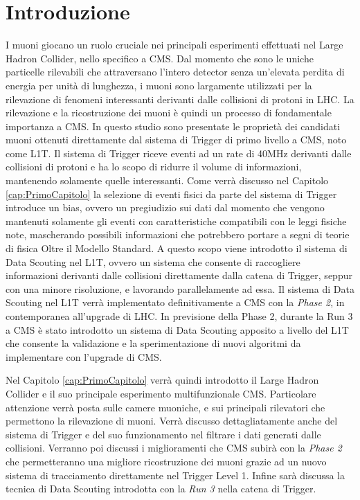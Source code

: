 \chapter{Introduzione}
\label{cap:Introduzione}

I muoni giocano un ruolo cruciale nei principali esperimenti effettuati nel Large Hadron Collider, nello specifico a CMS. Dal momento che sono le uniche particelle rilevabili che attraversano l'intero detector senza un'elevata perdita di energia per unità di lunghezza, i muoni sono largamente utilizzati per la rilevazione di fenomeni interessanti derivanti dalle collisioni di protoni in LHC. La rilevazione e la ricostruzione dei muoni è quindi un processo di fondamentale importanza a CMS.\newline
In questo studio sono presentate le proprietà dei candidati muoni ottenuti direttamente dal sistema di Trigger di primo livello a CMS, noto come L1T. Il sistema di Trigger riceve eventi ad un rate di 40MHz derivanti dalle collisioni di protoni e ha lo scopo di ridurre il volume di informazioni, mantenendo solamente quelle interessanti.
Come verrà discusso nel Capitolo \ref{cap:PrimoCapitolo} la selezione di eventi fisici da parte del sistema di Trigger introduce un bias, ovvero un pregiudizio sui dati dal momento che vengono mantenuti solamente gli eventi con caratteristiche compatibili con le leggi fisiche note, mascherando possibili informazioni che potrebbero portare a segni di teorie di fisica Oltre il Modello Standard. A questo scopo viene introdotto il sistema di Data Scouting nel L1T, ovvero un sistema che consente di raccogliere informazioni derivanti dalle collisioni direttamente dalla catena di Trigger, seppur con una minore risoluzione, e lavorando parallelamente ad essa. Il sistema di Data Scouting nel L1T verrà implementato definitivamente a CMS con la \textit{Phase 2}, in contemporanea all'upgrade di LHC. In previsione della Phase 2, durante la Run 3 a CMS è stato introdotto un sistema di Data Scouting apposito a livello del L1T che consente la validazione e la sperimentazione di nuovi algoritmi da implementare con l'upgrade di CMS.

Nel Capitolo \ref{cap:PrimoCapitolo} verrà quindi introdotto il Large Hadron Collider e il suo principale esperimento multifunzionale CMS. Particolare attenzione verrà posta sulle camere muoniche, e sui principali rilevatori che permettono la rilevazione di muoni. Verrà discusso dettagliatamente anche del sistema di Trigger e del suo funzionamento nel filtrare i dati generati dalle collisioni. Verranno poi discussi i miglioramenti che CMS subirà con la \textit{Phase 2} che permetteranno una migliore ricostruzione dei muoni grazie ad un nuovo sistema di tracciamento direttamente nel Trigger Level 1. Infine sarà discussa la tecnica di Data Scouting introdotta con la \textit{Run 3} nella catena di Trigger.


